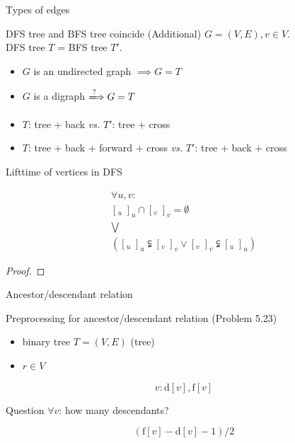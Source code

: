 \begin{frame}{Types of edges}
  \begin{exampleblock}{DFS tree and BFS tree coincide (Additional)}
    $G = (V,E), v \in V$. \\
	DFS tree $T$ = BFS tree $T'$.

    \begin{itemize}
      \item $G$ is an undirected graph $\implies G = T$
      \item $G$ is a digraph $\xLongrightarrow{?} G = T$
    \end{itemize}
  \end{exampleblock}

  \pause
  \begin{itemize}
	\item $T$: tree + back \emph{vs.} $T'$: tree + cross
	\pause
	\item $T$: tree + back + forward + cross \emph{vs.} $T'$: tree + back + cross 
  \end{itemize}
\end{frame}
\begin{frame}{Lifttime of vertices in DFS}
  \begin{theorem}
	\begin{gather*}
	  \forall u,v: \\
	  [_{u} \; ]_{u} \cap [_{v} \; ]_{v} = \emptyset \\
	  \bigvee \\
	  ([_{u} \; ]_{u} \subsetneqq [_{v} \; ]_{v} \lor [_{v} \; ]_{v} \subsetneqq [_{u} \; ]_{u})
	\end{gather*}
  \end{theorem}

  \pause

  \begin{proof}
  \end{proof}
\end{frame}
\begin{frame}{Ancestor/descendant relation}
  \begin{exampleblock}{Preprocessing for ancestor/descendant relation (Problem 5.23)}
    \begin{itemize}
      \item binary tree $T = (V, E)$ (tree)
      \item $r \in V$
    \end{itemize}
  \end{exampleblock}

  \[
	v: \text{d}[v], \text{f}[v]
  \]

  \pause
  \begin{alertblock}{Question}
    $\forall v$: how many descendants?

	\pause
    \[
	  (\text{f}[v] - \text{d}[v] - 1) / 2
	\]
  \end{alertblock}
\end{frame}
